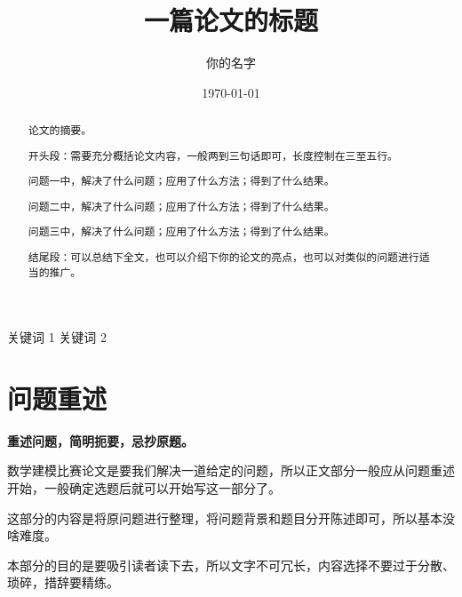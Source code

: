 




\title{一篇论文的标题}
\author{你的名字}
\date{\today}
\maketitle
\thispagestyle{empty}

\newpage
\setcounter{page}{1}
\begin{abstract}
论文的摘要。

开头段：需要充分概括论文内容，一般两到三句话即可，长度控制在三至五行。

问题一中，解决了什么问题；应用了什么方法；得到了什么结果。

问题二中，解决了什么问题；应用了什么方法；得到了什么结果。

问题三中，解决了什么问题；应用了什么方法；得到了什么结果。

结尾段：可以总结下全文，也可以介绍下你的论文的亮点，也可以对类似的问题进行适当的推广。
\end{abstract}

\begin{keyword}
	关键词 1 \quad 关键词 2
\end{keyword}


\newpage
\section{问题重述}    
\textbf{重述问题，简明扼要，忌抄原题。}

数学建模比赛论文是要我们解决一道给定的问题，所以正文部分一般应从问题重述开始，一般确定选题后就可以开始写这一部分了。

这部分的内容是将原问题进行整理，将问题背景和题目分开陈述即可，所以基本没啥难度。

本部分的目的是要吸引读者读下去，所以文字不可冗长，内容选择不要过于分散、琐碎，措辞要精练。

